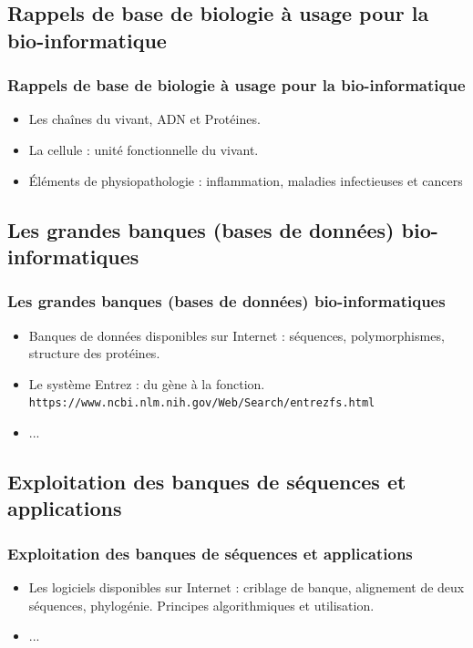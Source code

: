 \documentclass{beamer}
\begin{document}
\def\titleSection0SubsectionI{Rappels de base de biologie {\`a} usage pour la bio-informatique}
\subsection{ \titleSection0SubsectionI }
\begin{frame}
	\frametitle{ \titleSection0SubsectionI }
	\begin{itemize}
		\item Les cha{\^i}nes du vivant, ADN et Prot{\'e}ines.
		\item La cellule : unit{\'e} fonctionnelle du vivant.
		\item {\'E}l{\'e}ments de physiopathologie : inflammation, maladies infectieuses et cancers
	\end{itemize}
\end{frame}

\def\titleSection0Subsection2{Les grandes banques (bases de donn{\'e}es) bio-informatiques}
\subsection{ \titleSection0Subsection2 }
\begin{frame}
	\frametitle{ \titleSection0Subsection2 }
	\begin{itemize}
		\item Banques de donn{\'e}es disponibles sur Internet : s{\'e}quences, polymorphismes, structure des prot{\'e}ines. 
		\item Le syst{\`e}me Entrez : du g{\`e}ne {\`a} la fonction. \texttt{https://www.ncbi.nlm.nih.gov/Web/Search/entrezfs.html}
		\item ... 
	\end{itemize}
\end{frame}

\def\titleSection0Subsection3{Exploitation des banques de s{\'e}quences et applications}
\subsection{ \titleSection0Subsection3 }
\begin{frame}
	\frametitle{ \titleSection0Subsection3 }
	\begin{itemize}
		\item Les logiciels disponibles sur Internet : criblage de banque, alignement de deux s{\'e}quences, phylog{\'e}nie. Principes algorithmiques et utilisation.
		\item ... 
	\end{itemize}
\end{frame}
\end{document}
